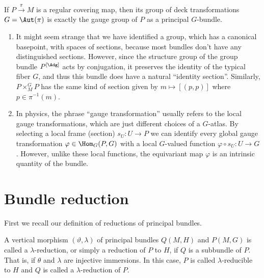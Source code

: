 \begin{example}
    If $P\overset{\pi}{\to} M$ is a regular covering map, then its group of deck transformations $G=\Aut(\pi)$ is exactly the gauge group of $P$ as a principal $G$-bundle.
\end{example}


\begin{rem}
    \begin{enumerate}
        \item It might seem strange that we have identified a group, which has a canonical basepoint, with spaces of sections, because most bundles don't have any distinguished sections. However, since the structure group of the group bundle $P^{[\Adg]}$ acts by conjugation, it preserves the identity of the typical fiber $G$, and thus this bundle does have a natural ``identity section''. Similarly, $P\times^G_MP$ has the same kind of section given by $m\mapsto [(p,p)]$ where $p\in \pi^{-1}(m)$.
        \item In physics, the phrase ``gauge transformation'' usually refers to the local gauge transformations, which are just different choices of a $G$-atlas. By selecting a local frame (section) $s_U:U\to P$ we can identify every global gauge transformation $\varphi\in \Hom_G(P,G)$ with a local $G$-valued  function $\varphi\circ s_U:U\to G$. However, unlike these local functions, the equivariant map $\varphi$ is an intrinsic quantity of the bundle.
    \end{enumerate}
\end{rem}





\section{Bundle reduction}\label{sec: bundle reduction}

First we recall our definition of reductions of principal bundles.

\begin{defn}
    A vertical morphism $(\vartheta,\lambda)$ of principal bundles $Q(M,H)$ and $P(M,G)$ is called a $\lambda$-reduction, or simply a reduction of $P$ to $H$, if $Q$ is a subbundle of $P$. That is, if $\theta$ and $\lambda$ are injective immersions. In this case, $P$ is called $\lambda$-reducible to $H$ and $Q$ is called a $\lambda$-reduction of $P$.
\end{defn}


